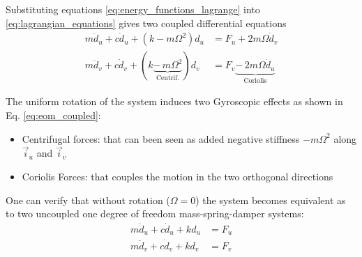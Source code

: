 \documentclass{ISMA_USD2020}
\begin{document}
Substituting equations \eqref{eq:energy_functions_lagrange} into \eqref{eq:lagrangian_equations} gives two coupled differential equations
\begin{subequations}
\label{eq:eom_coupled}
  \begin{align}
    m \ddot{d}_u + c \dot{d}_u + ( k - m \Omega^2 ) d_u &= F_u + 2 m \Omega \dot{d}_v \\
    m \ddot{d}_v + c \dot{d}_v + ( k \underbrace{-\,m \Omega^2}_{\text{Centrif.}} ) d_v &= F_v \underbrace{-\,2 m \Omega \dot{d}_u}_{\text{Coriolis}}
  \end{align}
\end{subequations}

The uniform rotation of the system induces two Gyroscopic effects as shown in Eq. \eqref{eq:eom_coupled}:
\begin{itemize}
\item Centrifugal forces: that can been seen as added negative stiffness \(- m \Omega^2\) along \(\vec{i}_u\) and \(\vec{i}_v\)
\item Coriolis Forces: that couples the motion in the two orthogonal directions
\end{itemize}

One can verify that without rotation (\(\Omega = 0\)) the system becomes equivalent as to two uncoupled one degree of freedom mass-spring-damper systems:
\begin{subequations}
\label{eq:oem_no_rotation}
  \begin{align}
    m \ddot{d}_u + c \dot{d}_u + k d_u &= F_u \\
    m \ddot{d}_v + c \dot{d}_v + k d_v &= F_v
  \end{align}
\end{subequations}
\end{document}
